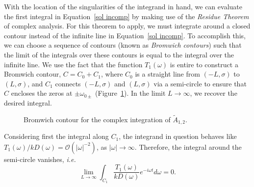 \documentclass[12pt]{../style-files/ociamthesis}
\begin{document}
With the location of the singularities of the integrand in hand, we can evaluate the first integral in Equation~\eqref{sol incomp} by making use of the \textit{Residue Theorem} of complex analysis. For this theorem to apply, we must integrate around a closed contour instead of the infinite line in Equation~\eqref{sol incomp}. To accomplish this, we can choose a sequence of contours (known as \textit{Bromwich contours}) such that the limit of the integrals over these contours is equal to the integral over the infinite line. We use the fact that the function $T_1(\omega)$ is entire to construct a Bromwich contour, $C = C_0 + C_1$, where $C_0$ is a straight line from $(-L, \sigma)$ to $(L, \sigma)$, and $C_1$ connects $(-L, \sigma)$ and $(L, \sigma)$ via a semi-circle to ensure that $C$ encloses the zeros at $\pm\omega_{0\pm}$ (Figure~\ref{fig: brom cont incomp}). In the limit $L \to \infty$, we recover the desired integral.

\begin{figure}
	\centering
	\caption{Bromwich contour for the complex integration of $\tilde{A}_{1,2}$.}
	\label{fig: brom cont incomp}
\end{figure}
Considering first the integral along $C_1$, the integrand in question behaves like $T_1(\omega)/kD(\omega) = \mathcal{O}(|\omega|^{-2})$, as $|\omega| \to \infty$. Therefore, the integral around the semi-circle vanishes, \textit{i.e.}
\begin{equation}
\lim_{L \to \infty} \int_{C_1} \frac{T_1(\omega)}{kD(\omega)} e^{-i\omega t} d\omega = 0.
\end{equation}
\end{document}
